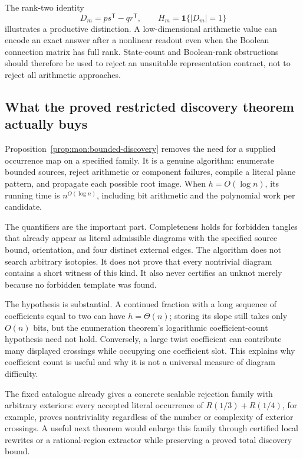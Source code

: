 The rank-two identity
\[
 D_m=ps^{\mathsf T}-qr^{\mathsf T},
 \qquad H_m=\mathbf1\{|D_m|=1\}
\]
illustrates a productive distinction. A low-dimensional arithmetic value
can encode an exact answer after a nonlinear readout even when the
Boolean connection matrix has full rank. State-count and Boolean-rank
obstructions should therefore be used to reject an unsuitable
representation contract, not to reject all arithmetic approaches.

\subsection{What the proved restricted discovery theorem actually buys}

Proposition~\ref{prop:mon:bounded-discovery} removes the need for a
supplied occurrence map on a specified family. It is a genuine algorithm:
enumerate bounded sources, reject arithmetic or component failures,
compile a literal plane pattern, and propagate each possible root image.
When \(h=O(\log n)\), its running time is \(n^{O(\log n)}\), including
bit arithmetic and the polynomial work per candidate.

The quantifiers are the important part. Completeness holds for forbidden
tangles that already appear as literal admissible diagrams with the
specified source bound, orientation, and four distinct external edges.
The algorithm does not search arbitrary isotopies. It does not prove
that every nontrivial diagram contains a short witness of this kind.
It also never certifies an unknot merely because no forbidden template
was found.

The hypothesis is substantial. A continued fraction with a long sequence
of coefficients equal to two can have \(h=\Theta(n)\); storing its slope
still takes only \(O(n)\) bits, but the enumeration theorem's logarithmic
coefficient-count hypothesis need not hold. Conversely, a large twist
coefficient can contribute many displayed crossings while occupying one
coefficient slot. This explains why coefficient count is useful and why
it is not a universal measure of diagram difficulty.

The fixed catalogue already gives a concrete scalable rejection family
with arbitrary exteriors: every accepted literal occurrence of
\(R(1/3)+R(1/4)\), for example, proves nontriviality regardless of the
number or complexity of exterior crossings. A useful next theorem would
enlarge this family through certified local rewrites or a rational-region
extractor while preserving a proved total discovery bound.

